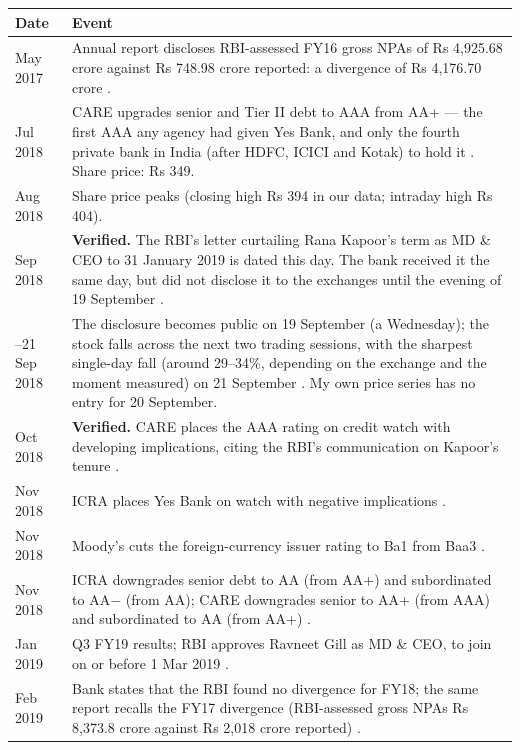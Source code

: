 \begingroup\small
\renewcommand{\arraystretch}{1.15}
\begin{longtable}{@{}>{\raggedright\arraybackslash}p{2.5cm}p{11.1cm}@{}}
\toprule\textbf{Date} & \textbf{Event}\\\midrule\endhead
12 May 2017 & Annual report discloses RBI-assessed FY16 gross NPAs of Rs 4,925.68 crore against Rs 748.98 crore reported: a divergence of Rs 4,176.70 crore \cite{bsDivFY16}.\\
5 Jul 2018 & CARE upgrades senior and Tier II debt to AAA from AA+ --- the first AAA any agency had given Yes Bank, and only the fourth private bank in India (after HDFC, ICICI and Kotak) to hold it \cite{bsCareWatch,sebiCareOrder}. Share price: Rs 349.\\
20 Aug 2018 & Share price peaks (closing high Rs 394 in our data; intraday high Rs 404).\\
17 Sep 2018 & \textbf{Verified.} The RBI's letter curtailing Rana Kapoor's term as MD \& CEO to 31 January 2019 is dated this day. The bank received it the same day, but did not disclose it to the exchanges until the evening of 19 September \cite{bsSep19disc}.\\
19--21 Sep 2018 & The disclosure becomes public on 19 September (a Wednesday); the stock falls across the next two trading sessions, with the sharpest single-day fall (around 29--34\%, depending on the exchange and the moment measured) on 21 September \cite{bsSep21fall}. My own price series has no entry for 20 September.\\
1 Oct 2018 & \textbf{Verified.} CARE places the AAA rating on credit watch with developing implications, citing the RBI's communication on Kapoor's tenure \cite{bsCareOct1}.\\
17 Nov 2018 & ICRA places Yes Bank on watch with negative implications \cite{bsIcraWatch}.\\
27 Nov 2018 & Moody's cuts the foreign-currency issuer rating to Ba1 from Baa3 \cite{bsNov28}.\\
28 Nov 2018 & ICRA downgrades senior debt to AA (from AA+) and subordinated to AA$-$ (from AA); CARE downgrades senior to AA+ (from AAA) and subordinated to AA (from AA+) \cite{bsNov28}.\\
24 Jan 2019 & Q3 FY19 results; RBI approves Ravneet Gill as MD \& CEO, to join on or before 1 Mar 2019 \cite{bsQ3FY19}.\\
13 Feb 2019 & Bank states that the RBI found no divergence for FY18; the same report recalls the FY17 divergence (RBI-assessed gross NPAs Rs 8,373.8 crore against Rs 2,018 crore reported) \cite{bsDivFY18}.\\

\end{longtable}
